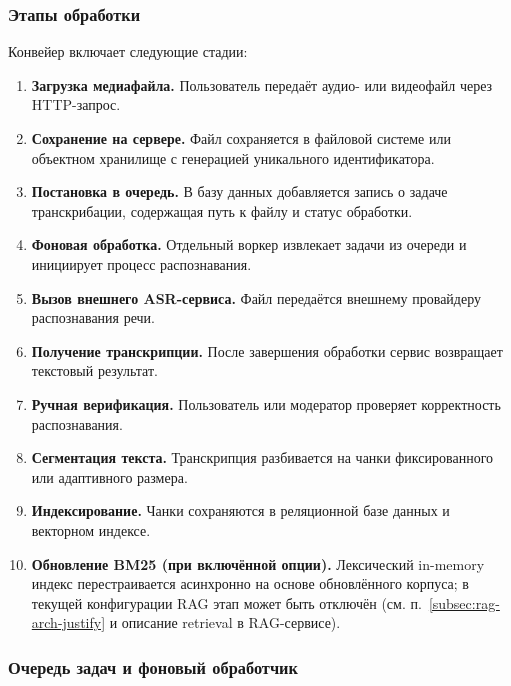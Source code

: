 \documentclass{article}
\begin{document}
\subsubsection{Этапы обработки}

Конвейер включает следующие стадии:

\begin{enumerate}
\item \textbf{Загрузка медиафайла.}  
Пользователь передаёт аудио- или видеофайл через HTTP-запрос.

\item \textbf{Сохранение на сервере.}  
Файл сохраняется в файловой системе или объектном хранилище с генерацией уникального идентификатора.

\item \textbf{Постановка в очередь.}  
В базу данных добавляется запись о задаче транскрибации, содержащая путь к файлу и статус обработки.

\item \textbf{Фоновая обработка.}  
Отдельный воркер извлекает задачи из очереди и инициирует процесс распознавания.

\item \textbf{Вызов внешнего ASR-сервиса.}  
Файл передаётся внешнему провайдеру распознавания речи.

\item \textbf{Получение транскрипции.}  
После завершения обработки сервис возвращает текстовый результат.

\item \textbf{Ручная верификация.}  
Пользователь или модератор проверяет корректность распознавания.

\item \textbf{Сегментация текста.}  
Транскрипция разбивается на чанки фиксированного или адаптивного размера.

\item \textbf{Индексирование.}  
Чанки сохраняются в реляционной базе данных и векторном индексе.

\item \textbf{Обновление BM25 (при включённой опции).}  
Лексический in-memory индекс перестраивается асинхронно на основе обновлённого корпуса; в текущей конфигурации RAG этап может быть отключён (см. п.~\ref{subsec:rag-arch-justify} и описание retrieval в RAG-сервисе).
\end{enumerate}

\subsubsection{Очередь задач и фоновый обработчик}
\end{document}
